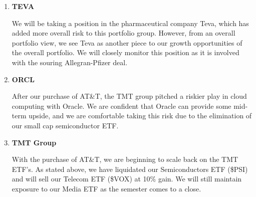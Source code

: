 \documentclass[11pt,pressrelease]{newlfm} %
\begin{document}
\begin{newlfm}


\vspace{-.65 in} 			%
\begin{singlespace} 		%

\begin{enumerate}
\item \textbf{TEVA} \par
We will be taking a position in the pharmaceutical company Teva, which has added more overall risk to this portfolio group.  However, from an overall portfolio view, we see Teva as another piece to our growth opportunities of the overall portfolio.  We will closely monitor this position as it is involved with the souring Allegran-Pfizer deal.  

\item \textbf{ORCL} \par
After our purchase of AT\&T, the TMT group pitched a riskier play in cloud computing with Oracle.  We are confident that Oracle can provide some mid-term upside, and we are comfortable taking this risk due to the elimination of our small cap semiconductor ETF.  

\item  \textbf{TMT Group} \par
With the purchase of AT\&T, we are beginning to scale back on the TMT ETF's. As stated above, we have liquidated our Semiconductors ETF (\$PSI) and will sell our Telecom ETF (\$VOX) at 10\% gain.  We will still maintain exposure to our Media ETF as the semester comes to a close.




\end{enumerate}
\end{singlespace}
\end{newlfm}
\end{document}
